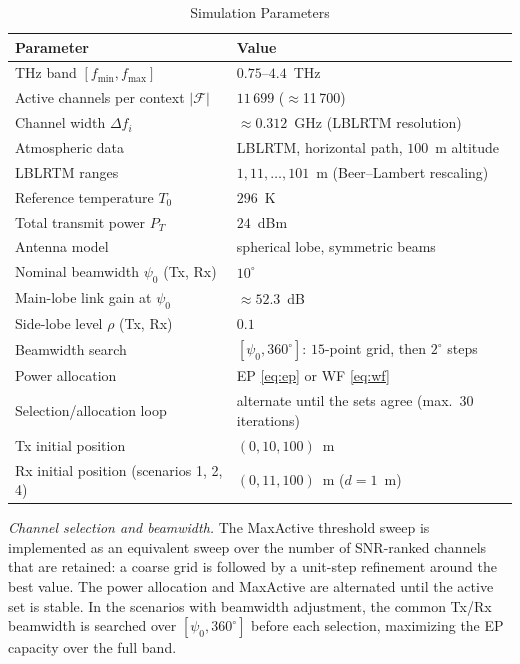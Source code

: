 \documentclass[correspondence]{IEEEtaes}
\newcommand{\PLNCH}{11\,700}          %
\begin{document}
\begin{table}[!t]
\caption{Simulation Parameters}
\label{tab:simparams}
\tablefont
\setlength{\tabcolsep}{3pt}
\begin{tabular*}{\columnwidth}{@{}p{}@{\extracolsep{\fill}}p{}@{}}
\hline
Parameter & Value\\
\hline
THz band $[f_{\min},f_{\max}]$ & $0.75$--$4.4$~THz\\
Active channels per context $|\mathcal{F}|$ & $11\,699$ ($\approx$\PLNCH{})\\
Channel width $\Delta f_i$ & $\approx0.312$~GHz (LBLRTM resolution)\\
Atmospheric data & LBLRTM, horizontal path, $100$~m altitude\\
LBLRTM ranges & $1,11,\dots,101$~m (Beer--Lambert rescaling)\\
Reference temperature $T_0$ & $296$~K\\
Total transmit power $P_T$ & $24$~dBm\\
Antenna model & spherical lobe, symmetric beams\\
Nominal beamwidth $\psi_0$ (Tx, Rx) & $10^\circ$\\
Main-lobe link gain at $\psi_0$ & $\approx52.3$~dB\\
Side-lobe level $\rho$ (Tx, Rx) & $0.1$\\
Beamwidth search & $[\psi_0,360^\circ]$: $15$-point grid, then $2^\circ$ steps\\
Power allocation & EP \eqref{eq:ep} or WF \eqref{eq:wf}\\
Selection/allocation loop & alternate until the sets agree (max.\ $30$ iterations)\\
Tx initial position & $(0,10,100)$~m\\
Rx initial position (scenarios 1, 2, 4) & $(0,11,100)$~m ($d=1$~m)\\
\hline
\end{tabular*}
\end{table}

\emph{Channel selection and beamwidth.} The MaxActive threshold sweep is implemented as an
equivalent sweep over the number of SNR-ranked channels that are retained: a coarse grid
is followed by a unit-step refinement around the best value. The power allocation and
MaxActive are alternated until the active set is stable. In the scenarios with beamwidth
adjustment, the common Tx/Rx beamwidth is searched over $[\psi_0,360^\circ]$ before each
selection, maximizing the EP capacity over the full band.
\end{document}
